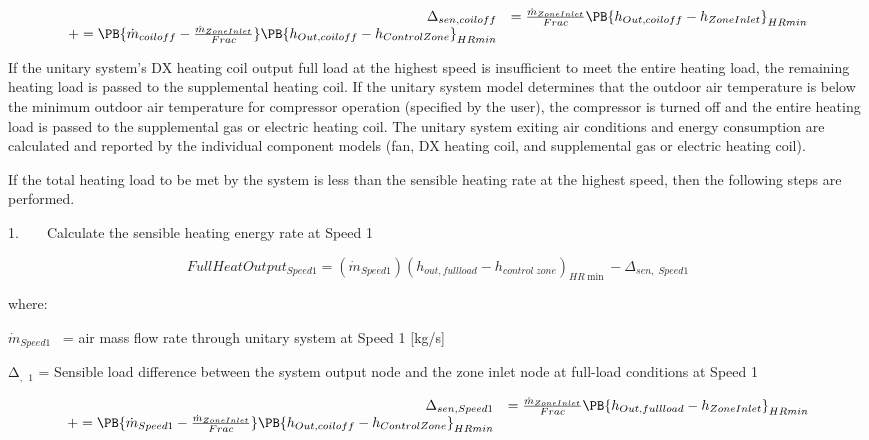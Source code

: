 \begin{equation}
  \begin{array}{rl}
    \Delta_{sen,coil off} &= \frac{\dot{m}_{ZoneInlet}}{Frac} \PB{h_{Out,coil off} - h_{ZoneInlet}}_{HRmin} \\
                              += \PB{\dot{m}_{coil off} - \frac{\dot{m}_{ZoneInlet}}{Frac}} \PB{h_{Out,coil off} - h_{ControlZone}}_{HRmin}
  \end{array}
\end{equation}

If the unitary system's DX heating coil output full load at the highest speed is insufficient to meet the entire heating load, the remaining heating load is passed to the supplemental heating coil. If the unitary system model determines that the outdoor air temperature is below the minimum outdoor air temperature for compressor operation (specified by the user), the compressor is turned off and the entire heating load is passed to the supplemental gas or electric heating coil. The unitary system exiting air conditions and energy consumption are calculated and reported by the individual component models (fan, DX heating coil, and supplemental gas or electric heating coil).

If the total heating load to be met by the system is less than the sensible heating rate at the highest speed, then the following steps are performed.

1.~~~~Calculate the sensible heating energy rate at Speed 1

\begin{equation}
FullHeatOutpu{t_{Speed1}} = ({\dot m_{Speed1}}){({h_{out,fullload}} - {h_{control\;zone}})_{HR\min }} - {\Delta_{sen,\;Speed1}}
\end{equation}

where:

\emph{\({\dot m_{Speed1}}\)}~ = air mass flow rate through unitary system at Speed 1 {[}kg/s{]}

Δ\emph{\(_{,}\) \(_{1}\)} = Sensible load difference between the system output node and the zone inlet node at full-load conditions at Speed 1

\begin{equation}
  \begin{array}{rl}
    \Delta_{sen,Speed1} &= \frac{\dot{m}_{ZoneInlet}}{Frac} \PB{h_{Out,full load} - h_{ZoneInlet}}_{HRmin} \\
                              += \PB{\dot{m}_{Speed1} - \frac{\dot{m}_{ZoneInlet}}{Frac}} \PB{h_{Out,coil off} - h_{ControlZone}}_{HRmin}
  \end{array}
\end{equation}

